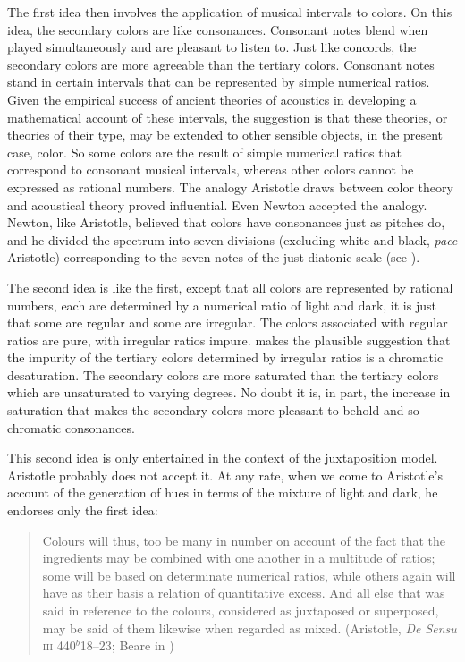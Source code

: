 The first idea then involves the application of musical intervals to colors. On this idea, the secondary colors are like consonances. Consonant notes blend when played simultaneously and are pleasant to listen to. Just like concords, the secondary colors are more agreeable than the tertiary colors. Consonant notes stand in certain intervals that can be represented by simple numerical ratios. Given the empirical success of ancient theories of acoustics in developing a mathematical account of these intervals, the suggestion is that these theories, or theories of their type, may be extended to other sensible objects, in the present case, color. So some colors are the result of simple numerical ratios that correspond to consonant musical intervals, whereas other colors cannot be expressed as rational numbers. The analogy Aristotle draws between color theory and acoustical theory proved influential. Even Newton accepted the analogy. Newton, like Aristotle, believed that colors have consonances just as pitches do, and he divided the spectrum into seven divisions (excluding white and black, \emph{pace} Aristotle) corresponding to the seven notes of the just diatonic scale (see \citealt[619]{Shapiro:1994uq}).

The second idea is like the first, except that all colors are represented by rational numbers, each are determined by a numerical ratio of light and dark, it is just that some are regular and some are irregular. The colors associated with regular ratios are pure, with irregular ratios impure. \citet[155-156]{Ross:1906fk} makes the plausible suggestion that the impurity of the tertiary colors determined by irregular ratios is a chromatic desaturation. The secondary colors are more saturated than the tertiary colors which are unsaturated to varying degrees. No doubt it is, in part, the increase in saturation that makes the secondary colors more pleasant to behold and so chromatic consonances.

This second idea is only entertained in the context of the juxtaposition model. Aristotle probably does not accept it. At any rate, when we come to Aristotle's account of the generation of hues in terms of the mixture of light and dark, he endorses only the first idea:
\begin{quote}
	Colours will thus, too be many in number on account of the fact that the ingredients may be combined with one another in a multitude of ratios; some will be based on determinate numerical ratios, while others again will have as their basis a relation of quantitative excess. And all else that was said in reference to the colours, considered as juxtaposed or superposed, may be said of them likewise when regarded as mixed. (Aristotle, \emph{De Sensu} \textsc{iii} 440\( ^{b} \)18--23; Beare in \citealt[10]{Barnes:1984uq})
\end{quote}

